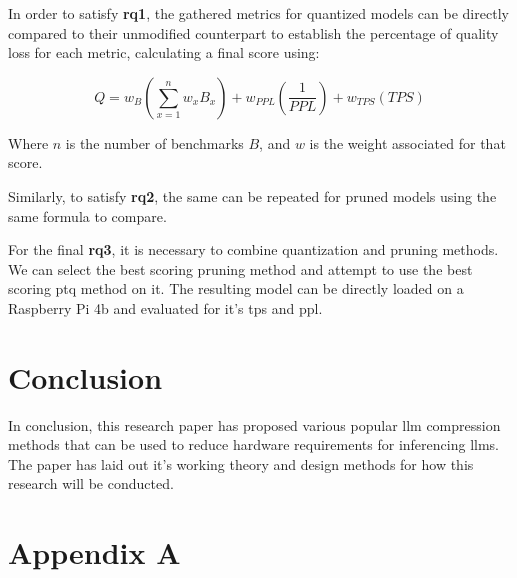 \documentclass{ifacconf}
\begin{document}
	In order to satisfy \textbf{\gls{rq}1}, the gathered metrics for quantized models can be directly compared to their unmodified counterpart to establish the percentage of quality loss for each metric, calculating a final score using:
	
	$$
	Q = w_{B} \left( \sum_{x=1}^{n} w_x B_x \right) + w_{PPL} \left( \frac{1}{PPL} \right) + w_{TPS}(TPS) 
	$$
	
	Where $n$ is the number of benchmarks $B$, and $w$ is the weight associated for that score.
	
	Similarly, to satisfy \textbf{\gls{rq}2}, the same can be repeated for pruned models using the same formula to compare.
	
	For the final \textbf{\gls{rq}3}, it is necessary to combine quantization and pruning methods. We can select the best scoring pruning method and attempt to use the best scoring \gls{ptq} method on it. The resulting model can be directly loaded on a Raspberry Pi 4b and evaluated for it's \gls{tps} and \gls{ppl}.
	
	\section{Conclusion}
	In conclusion, this research paper has proposed various popular \gls{llm} compression methods that can be used to reduce hardware requirements for inferencing \glspl{llm}. The paper has laid out it's working theory and design methods for how this research will be conducted.
	
	
	
	\printglossary[title={Glossary}]
	
	\appendix
	\section{Appendix A}
\end{document}

